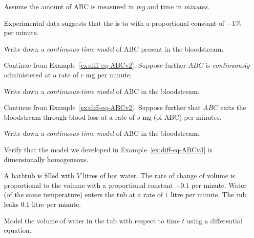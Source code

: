 \documentclass[../main.tex]{subfiles}
\begin{document}
Assume the amount of ABC is measured in \emph{mg} and time in \emph{minutes}.

\begin{example} \label{ex:diff-eq-ABCv1}
  Experimental data suggests that the  is  to  with a proportional constant of \(-1\%\) per minute.

  Write down a \emph{continuous-time model} of ABC present in the bloodstream.
\end{example}

\begin{example} \label{ex:diff-eq-ABCv2}
  Continue from Example~\ref{ex:diff-eq-ABCv2}.  Suppose further \(ABC\) is \emph{continuously} administered at a rate of \(r\) mg per minute. 

  Write down a \emph{continuous-time model} of ABC in the bloodstream.
\end{example}

\begin{example} \label{ex:diff-eq-ABCv3}
  Continue from Example~\ref{ex:diff-eq-ABCv2}.  Suppose further that \(ABC\) exits the bloodstream through blood loss at a rate of \(s\) mg (of ABC) per minutes. 

  Write down a \emph{continuous-time model} of ABC in the bloodstream.
\end{example}

\begin{example}
  Verify that the model we developed in Example~\ref{ex:diff-eq-ABCv3} is dimensionally homogeneous.
\end{example}

\clearpage

\begin{example}
  A bathtub is filled with \(V\) litres of hot water. The rate of change of volume is proportional to the volume with a proportional constant \(-0.1\) per minute.  Water (of the same temperature) enters the tub at a rate of \(1\) litre per minute. The tub leaks \(0.1\) litre per minute. 

  Model the volume of water in the tub with respect to time \(t\) using a differential equation.

\end{example}
\end{document}
